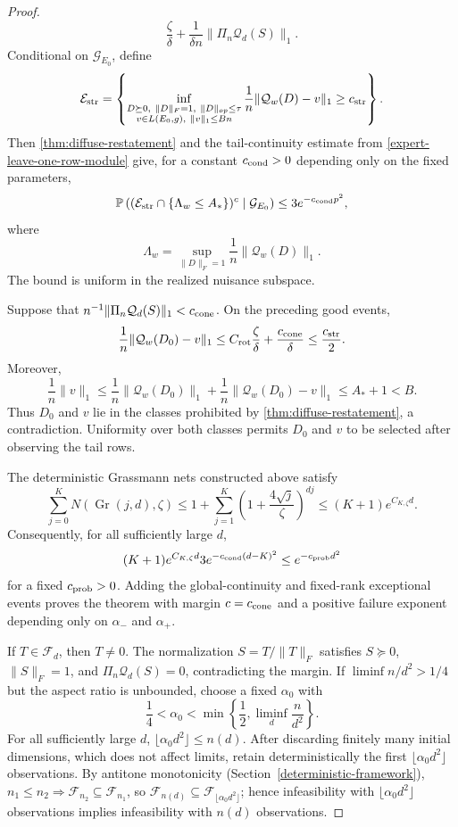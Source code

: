 \documentclass[11pt]{article}
\numberwithin{equation}{section}
\theoremstyle{definition}
\theoremstyle{remark}
\newcommand{\Pp}{\mathbb P}
\newcommand{\1}{\boldsymbol 1}
\newcommand{\cF}{\mathcal F}
\newcommand{\PiZero}{\Pi_n}
\begin{document}
\begin{aiblock}
\begin{proof}
\[    \frac\zeta\delta+\frac1{\delta n}\|\PiZero\mathcal
    Q_d(S)\|_1.
  \]
  Conditional on $\mathcal G_{E_0}$, define
  \[
    \mathcal E_{\rm str}=\left\{ \inf_{\substack{D\succeq0,\
    \|D\|_F=1,\ \|D\|_{op}\le\tau\\ v\in L(E_0,g),\
    \|v\|_1\le Bn}} \frac1n\|\mathcal Q_w(D)-v\|_1\ge
    c_{\rm str} \right\}.
  \]
  Then \cref{thm:diffuse-restatement} and the
  tail-continuity estimate from
  \cref{expert-leave-one-row-module} give, for a constant
  $c_{\rm cond}>0$ depending only on the fixed parameters,
  \[
    \Pp\left((\mathcal E_{\rm str}\cap\{\Lambda_w\le
    A_*\})^c\mid\mathcal G_{E_0}\right)\le3e^{-c_{\rm
    cond}p^2},
  \]
  where
  \[
    \Lambda_w=\sup_{\|D\|_F=1}\frac1n\|\mathcal Q_w(D)\|_1.
  \]
  The bound is uniform in the realized nuisance subspace.

  Suppose that $n^{-1}\|\PiZero\mathcal Q_d(S)\|_1<
  c_{\rm cone}$. On the preceding good events,
  \[
    \frac1n\|\mathcal Q_w(D_0)-v\|_1 \le C_{\rm rot}
    \frac\zeta\delta+\frac{c_{\rm cone}}\delta \le
    \frac{c_{\rm str}}2.
  \]
  Moreover,
  \[
    \frac1n\|v\|_1 \le\frac1n\|\mathcal Q_w(D_0)\|_1+
    \frac1n\|\mathcal Q_w(D_0)-v\|_1 \le A_*+1<B.
  \]
  Thus $D_0$ and $v$ lie in the classes prohibited by
  \cref{thm:diffuse-restatement}, a contradiction.
  Uniformity over both classes permits $D_0$ and $v$ to be
  selected after observing the tail rows.

  The deterministic Grassmann nets constructed above
  satisfy
  \[
    \sum_{j=0}^K N(\operatorname{Gr}(j,d),\zeta) \le1+
    \sum_{j=1}^K \left(1+\frac{4\sqrt j}{\zeta}\right)^{dj}
    \le(K+1)e^{C_{K,\zeta}d}.
  \]
  Consequently, for all sufficiently large $d$,
  \[
    (K+1)e^{C_{K,\zeta}d}3e^{-c_{\rm cond}(d-K)^2}
    \le e^{-c_{\rm prob}d^2}
  \]
  for a fixed $c_{\rm prob}>0$. Adding the
  global-continuity and fixed-rank exceptional events
  proves the theorem with margin $c=c_{\rm cone}$ and a
  positive failure exponent depending only on $\alpha_-$
  and $\alpha_+$.

  If $T\in\mathcal F_d$, then $T\ne0$. The normalization
  $S=T/\|T\|_F$ satisfies $S\succeq0$, $\|S\|_F=1$, and
  $\PiZero\mathcal Q_d(S)=0$, contradicting the margin. 
    If $\liminf n/d^2>1/4$ but the aspect ratio is
  unbounded, choose a fixed $\alpha_0$ with
  \[
    \frac14<\alpha_0<\min\left\{\frac12,
    \liminf_d\frac{n}{d^2}\right\}.
  \]
  For all sufficiently large $d$,
  $\lfloor\alpha_0d^2\rfloor\le n(d)$. After
  discarding finitely many initial dimensions,
  which does not affect limits, retain
  deterministically the first
  $\lfloor\alpha_0d^2\rfloor$ observations. 
  By antitone monotonicity
  (Section~\ref{deterministic-framework}),
  $n_1\le n_2\Rightarrow
  \cF_{n_2}\subseteq\cF_{n_1}$, so
  $\cF_{n(d)}\subseteq
  \cF_{\lfloor\alpha_0d^2\rfloor}$; hence
  infeasibility with
  $\lfloor\alpha_0d^2\rfloor$ observations implies
  infeasibility with $n(d)$ observations.
 

\end{proof}
\end{aiblock}
\end{document}
